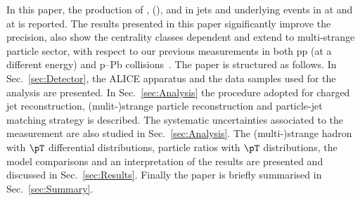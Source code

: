
In this paper, the production of \kzero, \lmb (\almb), \Xis and \Oms in jets and underlying events in \pp at \thirteen and \pPb at \fivenn is reported.
The results presented in this paper significantly improve the precision, also show the centrality classes dependent and extend to multi-strange particle sector, with respect to our previous measurements in both pp (at a different energy) and p–Pb collisions~\cite{V0injet}. 
The paper is structured as follows.
In Sec.~\ref{sec:Detector}, the ALICE apparatus and the data samples used for the analysis are presented. In Sec.~\ref{sec:Analysis} the procedure adopted for charged jet reconstruction, (mulit-)strange particle reconstruction and particle-jet matching strategy is described. 
The systematic uncertainties associated to the measurement are also studied in Sec.~\ref{sec:Analysis}.
The (multi-)strange hadron with $\pT$ differential distributions, particle ratios with $\pT$ distributions, the model comparisons and an interpretation of the results are presented and discussed in Sec.~\ref{sec:Results}.  Finally the paper is briefly summarised in Sec.~\ref{sec:Summary}.